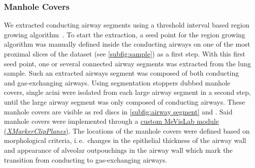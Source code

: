 \documentclass[twoside,paper=a4,abstract=true,english,DIVcalc]{scrartcl}
\newcommand{\ie}{i.\,e.\ }
\begin{document}
\subsubsection{Manhole Covers}
We extracted conducting airway segments using a threshold interval based region growing algorithm~\cite{Zucker1976}. To start the extraction, a seed point for the region growing algorithm was manually defined inside the conducting airways on one of the most proximal slices of the dataset (see \autoref{subfig:sample}) as a first step. With this first seed point, one or several connected airway segments was extracted from the lung sample. Such an extracted airways segment was composed of both conducting and gas-exchanging airways. Using segmentation stoppers dubbed manhole covers, single acini were isolated from each large airway segment in a second step, until the large airway segment was only composed of conducting airways. These manhole covers are visible as red discs in \autoref{subfig:airway segment} and . Said manhole covers were implemented through a \href{http://www.mevis-research.de/cgi-bin/discus/board-auth.cgi?lm=1282233250&file=/839/11760.html}{custom MeVisLab module (\emph{XMarkerClipPlanes})}. The locations of the manhole covers were defined based on morphological criteria, \ie changes in the epithelial thickness of the airway wall and appearance of alveolar outpouchings in the airway wall which mark the transition from conducting to gas-exchanging airways.
\end{document}
